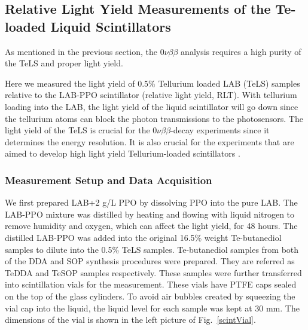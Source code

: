 \subsection{Relative Light Yield Measurements of the Te-loaded Liquid Scintillators}
As mentioned in the previous section, the $0\nu\beta\beta$ analysis requires a high purity of the TeLS and proper light yield. %

Here we measured the light yield of $0.5\%$ Tellurium loaded LAB (TeLS) samples relative to the LAB-PPO scintillator (relative light yield, RLT). With tellurium loading into the LAB, the light yield of the liquid scintillator will go down since the tellurium atoms can block the photon transmissions to the photosensors.  The light yield of the TeLS is crucial for the $0\nu\beta\beta$-decay experiments since it determines the energy resolution. It is also crucial for the experiments that are aimed to develop high light yield Tellurium-loaded scintillators \cite{biller2017new}.

\subsubsection{Measurement Setup and Data Acquisition}

We first prepared LAB+2 g/L PPO by dissolving PPO into the pure LAB. The LAB-PPO mixture was distilled by heating and flowing with liquid nitrogen to remove humidity and oxygen, which can affect the light yield, for 48 hours. The distilled LAB-PPO was added into the original 16.5\% weight Te-butanediol samples to dilute into the 0.5\% TeLS samples.  Te-butanediol samples from both of the DDA and SOP synthesis procedures were prepared. They are referred as TeDDA and TeSOP samples respectively. These samples were further transferred into scintillation vials for the measurement. These vials have PTFE caps sealed on the top of the glass cylinders. To avoid air bubbles created by squeezing the vial cap into the liquid, the liquid level for each sample was kept at 30 mm. The dimensions of the vial is shown in the left picture of Fig.~\ref{scintVial}.

